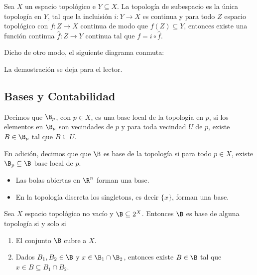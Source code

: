 \documentclass[11pt]{article}
\begin{document}
\begin{lema}
    Sea $X$ un espacio topológico e $Y\subseteq X$. La topología de subespacio es la única 
    topología en $Y$, tal que la incluisión $i:Y\to X$ es continua y para todo $Z$ espacio
    topológico con $f:Z\to X$ continua de modo que $f(Z)\subseteq Y$, entonces existe una función
    continua $\hat{f}:Z\to Y$ continua tal que $f=i\circ\hat{f}$.

    \vspace{2mm}
    \noindent Dicho de otro modo, el siguiente diagrama conmuta:

    \centerline{
    }
\end{lema}

\noindent La demostración se deja para el lector.

\subsection{Bases y Contabilidad}

\begin{dfn}
    Decimos que $\B_{p}$, con $p\in X$, es una base local de la topología en $p$, si los elementos 
    en $\B_{p}$ son vecindades de $p$ y para toda vecindad $U$ de $p$, existe $B\in\B_{p}$ tal que 
    $B\subseteq U$.
\end{dfn}

\noindent En adición, decimos que que $\B$ es base de la topología si para todo $p\in X$, existe
$\B_{p}\subseteq\B$ base local de $p$.

\begin{ejm} \hspace{1mm}
    \begin{itemize}
        \item Las bolas abiertas en $\R^{n}$ forman una base.

        \item En la topología discreta los singletons, es decir $\{x\}$, forman una base.
    \end{itemize}
\end{ejm}

\begin{prop}
    Sea $X$ espacio topológico no vacío y $\B\subseteq 2^{X}$. Entonces $\B$ es base de alguna 
    topología si y solo si
    \begin{enumerate}
        \item[(i)] El conjunto $\B$ cubre a $X$.
        
        \item[(ii)] Dados $B_{1},B_{2}\in\B$ y $x\in\B_{1}\cap\B_{2}$, entonces existe $B\in\B$ 
        tal que $x\in B\subseteq B_{1}\cap B_{2}$.
    \end{enumerate}
\end{prop}
\end{document}
